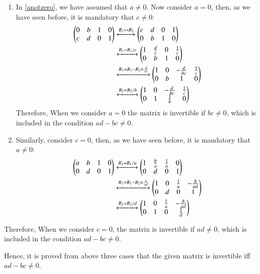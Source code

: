 \documentclass[journal,12pt,twocolumn]{IEEEtran}
\begin{document}
\begin{enumerate}
\item
In \eqref{anotzero}, we have assumed that $a \neq 0$. Now consider $a = 0$, then, as we have seen before, it is mandatory that $c \neq 0$:
\begin{align}
    \begin{pmatrix}0 & b & 1 & 0 \\ c & d & 0 & 1\end{pmatrix} &\xleftrightarrow{R_1\leftrightarrow R_2}  \begin{pmatrix}c & d & 0 & 1 \\ 0 & b & 1 & 0\end{pmatrix} \\
    &\xleftrightarrow{R_1 = R_1/c}\begin{pmatrix}1 & \frac{d}{c} & 0 & \frac{1}{c} \\ 0 & b & 1 & 0\end{pmatrix}  \nonumber \\
    &\xleftrightarrow{R_1 = R_1 - R_2\times \frac{d}{bc}}\begin{pmatrix}1 & 0 & -\frac{d}{bc} & \frac{1}{c} \\ 0 & b & 1 & 0\end{pmatrix}\nonumber\\
    &\xleftrightarrow{R_2 = R_2/b}\begin{pmatrix}1 & 0 & -\frac{d}{bc} & \frac{1}{c} \\ 0 & 1 & \frac{1}{b} & 0\end{pmatrix} \nonumber
\end{align}
Therefore, When we consider $a=0$ the matrix is invertible if $bc\neq0$, which is included in the condition $ad-bc\neq0$. 
\item Similarly, consider $c=0$, then, as we have seen before, it is mandatory that $a\neq0$:
\begin{align}
     \begin{pmatrix}a & b & 1 & 0 \\ 0 & d & 0 & 1\end{pmatrix} &\xleftrightarrow{R_1 = R_1/a}\begin{pmatrix}1 & \frac{b}{a} & \frac{1}{a} & 0 \\ 0 & d & 0 & 1\end{pmatrix}\\
     &\xleftrightarrow{R_1 = R_1 - R_2\times\frac{b}{ad}}\begin{pmatrix}1 & 0 & \frac{1}{a} & -\frac{b}{ad} \\ 0 & d & 0 & 1\end{pmatrix}\nonumber\\
     &\xleftrightarrow{R_2 = R_2/d}\begin{pmatrix}1 & 0 & \frac{1}{a} & -\frac{b}{ad} \\ 0 & 1 & 0 & \frac{1}{d}\end{pmatrix} \nonumber
\end{align}
\end{enumerate}
Therefore, When we consider $c=0$, the matrix is invertible if $ad\neq0$, which is included in the condition $ad-bc\neq0$.\par
Hence, it is proved from above three cases that the given matrix is invertible iff $ad - bc \neq 0$. 
\end{document}
